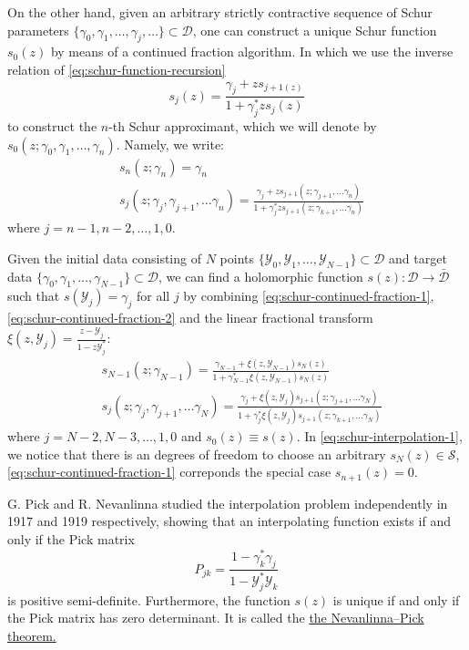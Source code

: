\documentclass[
	preprint,%
	aps,
	prb,
	showpacs,	
	amsmath, amssymb]{revtex4-2}
\newcommand{\Y}{ {\mathcal{Y}} }
\newcommand{\D}{ {\mathcal{D}} }
\newcommand{\Dbar}{ {\bar{\mathcal{D}}} }
\begin{document}
On the other hand, given an arbitrary strictly contractive sequence 
of Schur parameters $\{\gamma_0, \gamma_1, \dots, \gamma_j, \dots\} \subset \D$, 
one can construct a unique Schur function $s_0(z)$ by means of a continued 
fraction algorithm. In which we use the inverse relation of
\cref{eq:schur-function-recursion}
\begin{equation}\label{eq:inv-schur-function-recursion}
	s_j(z) = \frac{\gamma_j + zs_{j+1(z)}}{1 + \gamma_j^* z s_j(z)}
\end{equation}
to construct the $n$-th Schur approximant, 
which we will denote by 
$s_0(z; \gamma_0,\gamma_1, \dots, \gamma_n)$. Namely, we write:
\begin{align}
	\label{eq:schur-continued-fraction-1}
	&s_n(z;\gamma_n) = \gamma_n \\
	\label{eq:schur-continued-fraction-2}
	&s_j(z;\gamma_j,\gamma_{j+1},\dots \gamma_n) 
	= \frac{\gamma_j + zs_{j+1}(z;\gamma_{j+1},\dots \gamma_n)}
		{1 + \gamma_j^* z s_{j+1}(z;\gamma_{k+1},\dots \gamma_n)}
\end{align}
where $j = n-1, n-2, \dots, 1, 0$.

Given the initial data consisting of $N$ points 
$\{\Y_0, \Y_1, \dots ,\Y_{N-1}\} \subset \D$ and target data
$\{\gamma_0, \gamma_1, \dots ,\gamma_{N-1}\} \subset \D$, 
we can find a holomorphic function $s(z): \D \to \Dbar$ 
such that $s(\Y_j) = \gamma_j$ for all $j$ by combining 
\cref{eq:schur-continued-fraction-1}, \cref{eq:schur-continued-fraction-2} 
and the linear fractional transform 
$\xi(z, \Y_j) = \frac{z - \Y_j}{1 - z\Y_j^*}$:
\begin{align}
	\label{eq:schur-interpolation-1}
	&s_{N-1}(z;\gamma_{N-1}) 
		= \frac{\gamma_{N-1} + \xi(z,\Y_{N-1})s_N(z)}
			{1 + \gamma_{N-1}^*\xi(z,\Y_{N-1})s_N(z)} \\
	\label{eq:schur-interpolation-2}
	&s_j(z;\gamma_j,\gamma_{j+1},\dots \gamma_N) 
		= \frac{\gamma_j + \xi(z,\Y_{j})s_{j+1}(z;\gamma_{j+1},\dots \gamma_N)}
			{1 + \gamma_j^* \xi(z,\Y_{j})s_{j+1}(z;\gamma_{k+1},\dots \gamma_N)}
\end{align}
where $j = N-2, N-3, \dots, 1, 0$ and $s_0(z) \equiv s(z)$. In \cref{eq:schur-interpolation-1}, 
we notice that there is an degrees of freedom to choose an 
arbitrary $s_N(z) \in \mathcal{S}$, \cref{eq:schur-continued-fraction-1} 
correponds the special case $s_{n+1}(z) = 0$.

G. Pick and R. Nevanlinna studied the interpolation problem 
independently in 1917\cite{Pick1917} and 1919\cite{nevanlinna1919uber} 
respectively, showing that an 
interpolating function exists if and only if the Pick matrix
\begin{equation}\label{eq:pick-matrix-origional}
	P_{jk} = \frac{1-\gamma_k^* \gamma_j}{1 - \Y_j^* \Y_k}
\end{equation}
is positive semi-definite. Furthermore, the function $s(z)$ is 
unique if and only if the Pick matrix has zero determinant. It 
is called the 
\href{https://en.wikipedia.org/wiki/Nevanlinna%E2%80%93Pick_interpolation}
	{the Nevanlinna–Pick theorem.}
\end{document}

